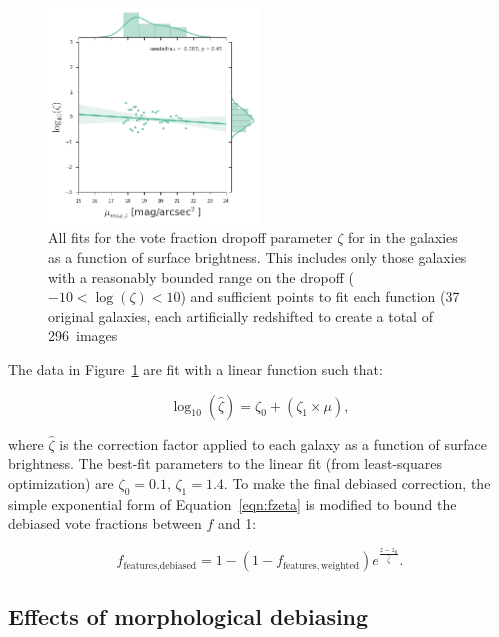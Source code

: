 \documentclass[twocolumn]{aastex6}
\begin{document}
\begin{figure}
\center
\includegraphics[width=0.50\textwidth]{figures/zeta_mu.png}
\caption{All fits for the vote fraction dropoff parameter $\zeta$ for
\ffeatures{} in the \ferengi{} galaxies as a function of surface
brightness. This includes only those galaxies with a reasonably bounded range
on the dropoff ($-10<\log(\zeta)<10$) and sufficient points to fit each
function (37 original galaxies, each artificially redshifted to create a total
of 296~images}
\label{fig:zeta_mu}
\end{figure}



The data in Figure~\ref{fig:zeta_mu} are fit with a linear function such that:

\begin{equation}
\log_{10}(\hat\zeta) = \zeta_0 + (\zeta_1 \times \mu),
\label{eqn:zetafit}
\end{equation}

\noindent where $\hat\zeta$ is the correction factor applied to each galaxy as
a function of surface brightness. The best-fit parameters to the linear fit
(from least-squares optimization) are $\zeta_0=0.1$, $\zeta_1=1.4$. To make the
final debiased correction, the simple exponential form of
Equation~\ref{eqn:fzeta} is modified to bound the debiased vote fractions
between $f$ and 1:

\begin{equation}
f_\textrm{features,debiased} = 1 - (1 - f_\mathrm{features,weighted})e^{\frac{z-z_0}{\hat\zeta}}.
\label{eqn:fzeta_mod}
\end{equation}

\subsection{Effects of morphological debiasing}\label{ssec:zeta_results}
\end{document}
